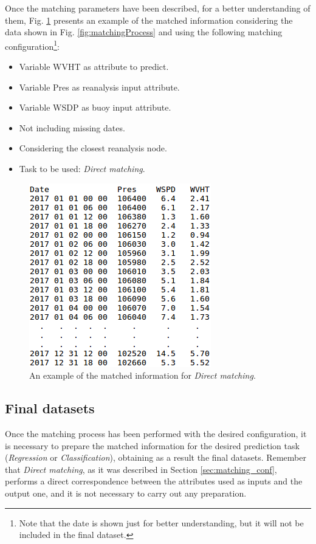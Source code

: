 \documentclass[energies,article,submit,moreauthors,pdftex]{Definitions/mdpi}
\begin{document}
				Once the matching parameters have been described, for a better understanding of them,  Fig. \ref{fig:directMatching} presents an example of the matched information considering the data shown in Fig. \ref{fig:matchingProcess} and using the following matching configuration\footnote{Note that the date is shown just for better understanding, but it will not be included in the final dataset.}:
					\begin{itemize}
						\item Variable WVHT as attribute to predict.
						\item Variable Pres as reanalysis input attribute.
						\item Variable WSDP as buoy input attribute.
						\item Not including missing dates.
						\item Considering the closest reanalysis node.
						\item Task to be used: \textit{Direct matching}.
					\end{itemize}
						
				\begin{figure}[ht!]
					\centering
					\includegraphics[scale=0.49]{figures/FigureDirectMatching.png}
					\caption{An example of the matched information for \textit{Direct matching}.}
					\label{fig:directMatching}
				\end{figure}
				
				
			\subsection{Final datasets} \label{sec:FinalDatasets}

				Once the matching process has been performed with the desired configuration, it is necessary to prepare the matched information for the desired prediction task (\textit{Regression} or \textit{Classification}), obtaining as a result the final datasets. Remember that \textit{Direct matching}, as it was described in Section \ref{sec:matching_conf}, performs a direct correspondence between the attributes used as inputs and the output one, and it is not necessary to carry out any preparation.
				
\end{document}
